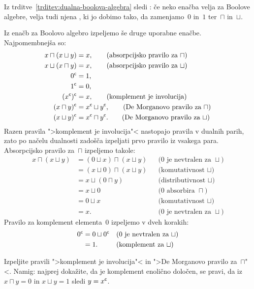 Iz trditve~\ref{trditev:dualna-boolova-algebra} sledi : če neko enačba velja za Boolove algebre, velja tudi njena , ki jo dobimo tako, da zamenjamo~$0$ in~$1$ ter~$\sqcap$ in~$\sqcup$.

Iz enačb za Boolovo algebro izpeljemo še druge uporabne enačbe.
%
Najpomembnejša so:
%
\begin{align}
  x \sqcap (x \sqcup y) &= x, \tag{absorpcijsko pravilo za~$\sqcap$} \\
  x \sqcup (x \sqcap y) &= x, \tag{absorpcijsko pravilo za~$\sqcup$} \\
  0^{\mathsf{c}} &= 1, \notag \\
  1^{\mathsf{c}} &= 0, \notag \\
  (x^{\mathsf{c}})^{\mathsf{c}} &= x, \tag{komplement je involucija} \\
  (x \sqcap y)^{\mathsf{c}} &= x^{\mathsf{c}} \sqcup y^{\mathsf{c}}, \tag{De Morganovo pravilo za~$\sqcap$} \\
  (x \sqcup y)^{\mathsf{c}} &= x^{\mathsf{c}} \sqcap y^{\mathsf{c}}. \tag{De Morganovo pravilo za~$\sqcup$}
\end{align}
%
Razen pravila ">komplement je involucija"< nastopajo pravila v dualnih parih, zato po načelu dualnosti zadošča izpeljati prvo pravilo iz vsakega para.
%
Absorpcijsko pravilo za~$\sqcap$ izpeljemo takole:
%
\begin{align*}
  x \sqcap (x \sqcup y)
  &= (0 \sqcup x) \sqcap (x \sqcup y) && \text{($0$ je nevtralen za~$\sqcup$)} \\
  &= (x \sqcup 0) \sqcap (x \sqcup y) && \text{(komutativnost~$\sqcup$)} \\
  &= x \sqcup (0 \sqcap y) && \text{(distributivnost~$\sqcup$)} \\
  &= x \sqcup 0 && \text{($0$ absorbira~$\sqcap$)} \\
  &= 0 \sqcup x && \text{(komutativnost~$\sqcup$)} \\
  &= x. && \text{($0$ je nevtralen za~$\sqcup$)}
\end{align*}
%
Pravilo za komplement elementa~$0$ izpeljemo v dveh korakih:
%
\begin{align*}
  0^{\mathsf{c}}
  &= 0 \sqcup 0^{\mathsf{c}} && \text{($0$ je nevtralen za~$\sqcup$)} \\
  &= 1. && \text{(komplement za~$\sqcup$)}
\end{align*}

\begin{vaja}
  Izpeljite pravili ">komplement je involucija"< in ">De Morganovo pravilo za~$\sqcap$"<.
  Namig: najprej dokažite, da je komplement enolično določen, se pravi, da iz $x \sqcap y = 0$ in $x \sqcup y = 1$ sledi $y = x^{\mathsf{c}}$.
\end{vaja}

